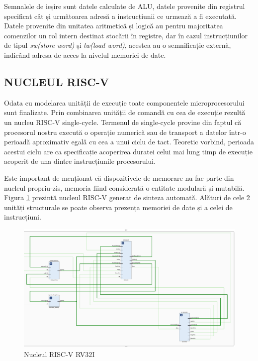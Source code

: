 \documentclass[12pt]{article}
\begin{document}
 Semnalele de ieșire sunt datele calculate de ALU, datele provenite din registrul specificat cât și următoarea adresă a instrucțiunii ce urmează a fi executată. Datele provenite din unitatea aritmetică și logică au pentru majoritatea comenzilor un rol intern destinat stocării în registre, dar în cazul instrucțiunilor de tipul \textit{sw(store word)} și \textit{lw(load word)}, acestea au o semnificație externă, indicând adresa de acces la nivelul memoriei de date.
 
\subsection{NUCLEUL RISC-V} 
Odata cu modelarea unității de execuție toate componentele microprocesorului sunt finalizate. Prin combinarea unității de comandă cu cea de execuție rezultă un nucleu RISC-V single-cycle. Termenul de single-cycle provine din faptul că procesorul nostru execută o operație numerică sau de transport a datelor într-o perioadă aproximativ egală cu cea a unui ciclu de tact. Teoretic vorbind, perioada acestui ciclu are ca specificație acoperirea duratei celui mai lung timp de execuție acoperit de una dintre instrucțiunile procesorului. 


Este important de menționat că dispozitivele de memorare nu fac parte din nucleul propriu-zis, memoria fiind considerată o entitate modulară și mutabilă. Figura \ref{Figura:52} prezintă nucleul RISC-V generat de sinteza automată. Alături de cele 2 unități structurale se poate observa prezența memoriei de date și a celei de instrucțiuni.

 \begin{figure}[h!]
 \includegraphics[width=1.0\textwidth]{core.png}
 \centering
 \caption{Nucleul RISC-V RV32I}
 \label{Figura:52}
 \end{figure}
\end{document}
